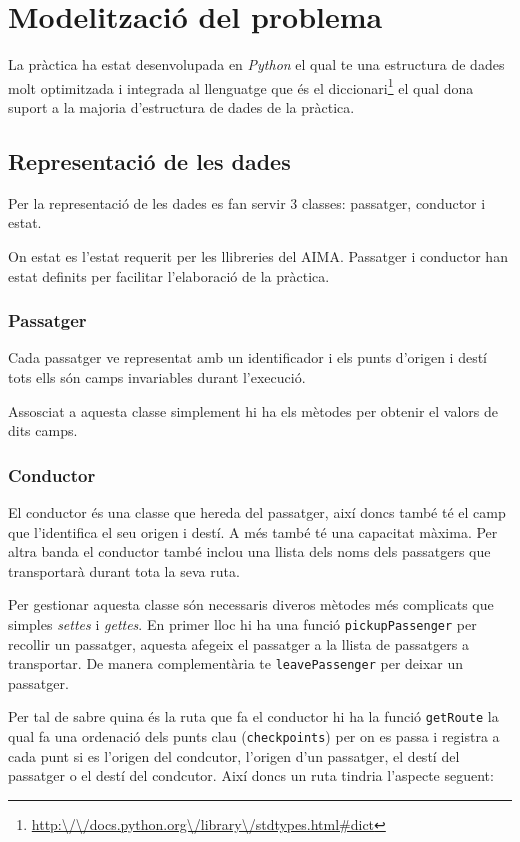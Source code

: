\section{Modelització del problema}
La pràctica ha estat desenvolupada en \emph{Python} el qual te una estructura de dades molt optimitzada
i integrada al llenguatge que és el diccionari\footnote{\url{http:\/\/docs.python.org\/library\/stdtypes.html\#dict}}
el qual dona suport a la majoria d'estructura de dades de la pràctica.

\subsection{Representació de les dades}
Per la representació de les dades es fan servir 3 classes: passatger, conductor i estat.

On estat es l'estat requerit per les llibreries del AIMA. Passatger i conductor han estat
definits per facilitar l'elaboració de la pràctica.

\subsubsection{Passatger}
Cada passatger ve representat amb un identificador i els punts d'origen i destí tots ells són
camps invariables durant l'execució.

Assosciat a aquesta classe simplement hi ha els mètodes per obtenir el valors de dits camps.

\subsubsection{Conductor}
El conductor és una classe que hereda del passatger, així doncs també té el camp que l'identifica
el seu origen i destí. A més també té una capacitat màxima.
Per altra banda el conductor també inclou una llista dels noms dels passatgers que transportarà
durant tota la seva ruta.

Per gestionar aquesta classe són necessaris diveros mètodes més complicats que simples \emph{settes} i \emph{gettes}.
En primer lloc hi ha una funció \texttt{pickupPassenger} per recollir un passatger, aquesta afegeix el passatger
a la llista de passatgers a transportar. De manera complementària te \texttt{leavePassenger} per deixar un 
passatger.

Per tal de sabre quina és la ruta que fa el conductor hi ha la funció \texttt{getRoute} la qual
fa una ordenació dels punts clau (\texttt{checkpoints}) per on es passa i registra a cada punt si es
l'origen del condcutor, l'origen d'un passatger, el destí del passatger o el destí del condcutor. Així
doncs un ruta tindria l'aspecte seguent: 


